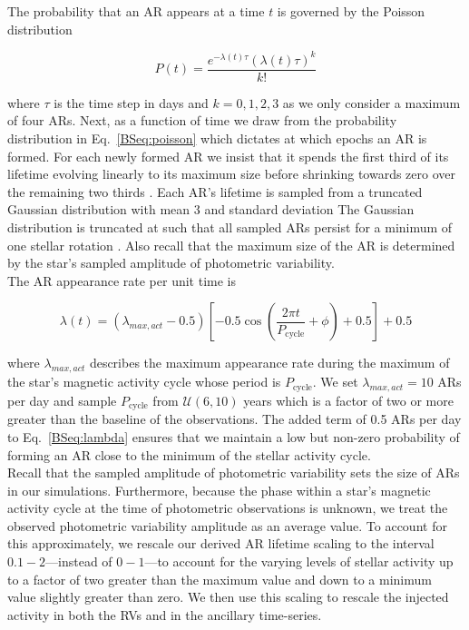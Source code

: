 The probability that an AR appears at a time $t$ is governed by the Poisson distribution

\begin{equation}
  P(t) = \frac{e^{-\lambda(t) \tau} (\lambda(t) \tau)^k}{k!} \label{BSeq:poisson}
\end{equation}

\noindent where $\tau$ is the time step in days and $k=0,1,2,3$ as we only consider a maximum of
four ARs. Next, as a function of time we draw from the probability distribution in Eq.~\ref{BSeq:poisson} 
which dictates at which epochs an AR is formed. For each newly formed AR 
we insist that it spends the first third of its lifetime evolving linearly to its maximum size before
shrinking towards zero over the remaining two thirds \citep{dumusque16a}.
Each AR's lifetime is sampled from a truncated Gaussian distribution with mean 3\prot{} and standard
deviation  The Gaussian distribution is truncated at \prot{} such that all sampled ARs persist
for a minimum of one stellar rotation \citep[e.g.][]{bonfils07,forveille09,hebrard16}.
Also recall that the maximum size of the AR is determined by the star's sampled amplitude of photometric
variability. \\

The AR appearance rate per unit time is

\begin{equation}
  \lambda(t) = (\lambda_{max,act} - 0.5) \left[ -0.5 \cos{\left( \frac{2\pi t}{P_{\text{cycle}}} + \phi \right)} + 0.5 \right] + 0.5
\label{BSeq:lambda}
\end{equation}

\noindent where $\lambda_{max,act}$ describes the maximum appearance rate during the maximum of the star's
magnetic activity cycle whose period is $P_{\text{cycle}}$. We set $\lambda_{max,act}=10$ ARs per day and sample
$P_{\text{cycle}}$ from $\mathcal{U}(6,10)$ years \citep{mascareno16, wargelin17} which is a factor of two or more
greater than the baseline of the observations. The added term of 0.5 ARs per day
to Eq.~\ref{BSeq:lambda} ensures that we maintain a low but non-zero probability of forming an AR close to the
minimum of the stellar activity cycle. \\

Recall that the sampled amplitude of photometric variability sets the size of ARs in our simulations.
Furthermore, because the phase within a star's magnetic activity cycle at the time of photometric observations
is unknown, we treat the observed photometric variability amplitude as an average value. To account for this
approximately, we rescale our
derived AR lifetime scaling to the interval $0.1-2$---instead of $0-1$---to account for the varying levels of
stellar activity up to a factor of two greater than the maximum value and down to a minimum value slightly greater
than zero. We then use this scaling to rescale the injected activity in both the RVs and in the ancillary time-series. \\

